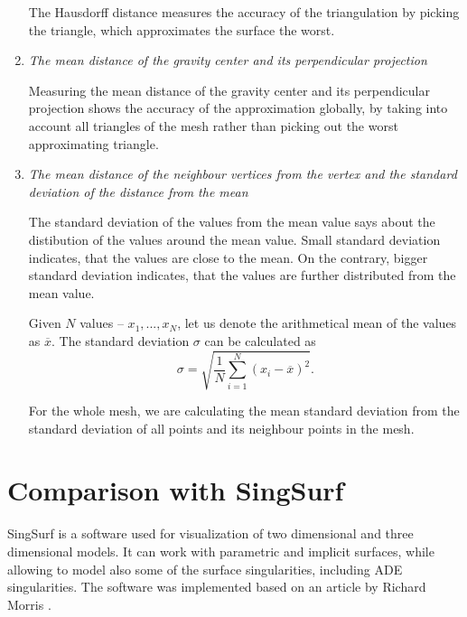 \begin{enumerate}
    The Hausdorff distance measures the accuracy of the triangulation by picking the 
    triangle, which approximates the surface the worst.

    \item \textit{The mean distance of the gravity center and its perpendicular projection}
    
    Measuring the mean distance of the gravity center and its perpendicular 
    projection shows the accuracy of the approximation globally, by taking into
    account all triangles of the mesh rather than picking out the worst approximating 
    triangle.

    \item \textit{The mean distance of the neighbour vertices from the vertex and the 
    standard deviation of the distance from the mean}

    The standard deviation of the values from the mean value says about the 
    distibution of the values around the mean value. Small standard deviation indicates,
    that the values are close to the mean. On the contrary, bigger standard deviation
    indicates, that the values are further distributed from the mean value.

    \begin{definition}
        Given $N$ values -- $x_1, ..., x_N$, let us denote the arithmetical mean 
        of the values as $\overline{x}$. The standard deviation $\sigma$ can be calculated
        as
        \begin{equation}
            \sigma = \sqrt{\frac{1}{N} \sum\limits_{i=1}^{N}(x_i - \overline{x})^2}. 
        \end{equation}
    \end{definition}

    For the whole mesh, we are calculating the mean standard deviation from the 
    standard deviation of all points and its neighbour points in the mesh.
\end{enumerate}

\section{Comparison with SingSurf}
\label{sub4.2}

SingSurf \cite{singsurf} is a software used for visualization of two dimensional
and three dimensional models. It can work with parametric and implicit surfaces, 
while allowing to model also some of the surface singularities, including
ADE singularities. The software was implemented based on an article by 
Richard Morris \cite{morris2003client}.

